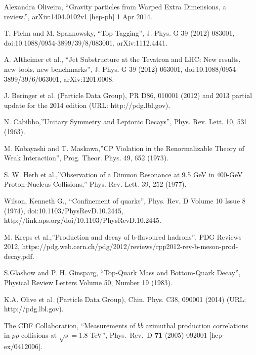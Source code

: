 \begin{thebibliography}{99}
% 

 Alexandra Oliveira, ``Gravity particles from Warped Extra Dimensions, a review.'', arXiv:1404.0102v1 [hep-ph] 1 Apr 2014.

 T. Plehn and M. Spannowsky, “Top Tagging”, J. Phys. G 39 (2012) 083001, doi:10.1088/0954-3899/39/8/083001, arXiv:1112.4441.

 A. Altheimer et al., “Jet Substructure at the Tevatron and LHC: New results, new tools, new benchmarks”, J. Phys. G 39 (2012) 063001, doi:10.1088/0954-3899/39/6/063001, arXiv:1201.0008.

J. Beringer et al. (Particle Data Group), PR D86, 010001 (2012) and 2013 partial update for the 2014 edition (URL: http://pdg.lbl.gov).

N. Cabibbo,''Unitary Symmetry and Leptonic Decays'', Phys. Rev. Lett. 10, 531 (1963).

M. Kobayashi and T. Maskawa,''CP Violation in the Renormalizable Theory of Weak Interaction'', Prog. Theor. Phys. 49, 652 (1973).

S. W. Herb et al.,''Observation of a Dimuon Resonance at 9.5 GeV in 400-GeV Proton-Nucleus Collisions,'' Phys. Rev. Lett. 39, 252 (1977).

Wilson, Kenneth G., ``Confinement of quarks'', Phys. Rev. D Volume 10 Issue 8 (1974), doi:10.1103/PhysRevD.10.2445, http://link.aps.org/doi/10.1103/PhysRevD.10.2445.

M. Kreps et al.,''Production and decay of b-flavoured hadrons'', PDG Reviews 2012, https://pdg.web.cern.ch/pdg/2012/reviews/rpp2012-rev-b-meson-prod-decay.pdf.

 S.Glashow and P. H. Ginsparg, ``Top-Quark Mass and Bottom-Quark Decay'', Physical Review Letters Volume 50, Number 19 (1983).

 K.A. Olive et al. (Particle Data Group), Chin. Phys. C38, 090001 (2014) (URL: http://pdg.lbl.gov).
 
 The CDF Collaboration, ``Measurements of $b\bar{b}$ azimuthal production correlations in $p\bar{p}$ collisions at $\sqrt{s} = 1.8$ TeV'', Phys.\ Rev.\ D {\bf 71} (2005) 092001 [hep-ex/0412006].


\end{thebibliography}
